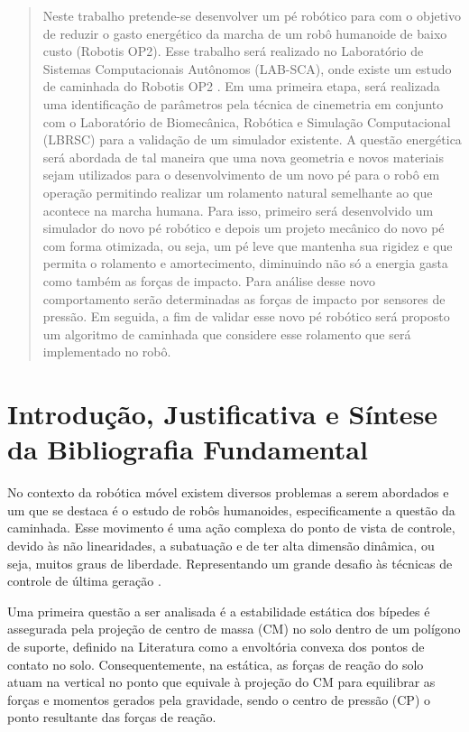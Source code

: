 \newpage
\doublespacing

\begin{abstract}
Neste trabalho pretende-se desenvolver um pé robótico para com o objetivo de reduzir o gasto energético da marcha de  um robô humanoide de baixo custo (Robotis OP2). Esse trabalho será realizado no  Laboratório de Sistemas Computacionais Autônomos (LAB-SCA), onde  existe um estudo de caminhada do Robotis OP2 . Em uma primeira etapa, será realizada uma identificação de parâmetros pela técnica de cinemetria em conjunto com o Laboratório de Biomecânica, Robótica e Simulação Computacional (LBRSC)  para a validação de um simulador existente.
A questão energética será abordada de tal maneira que uma nova geometria e novos materiais sejam utilizados para o desenvolvimento de um novo pé para o robô em operação permitindo realizar um rolamento natural semelhante ao que acontece na marcha humana. Para isso, primeiro será desenvolvido um simulador do novo pé robótico  e depois um projeto mecânico do novo pé com forma otimizada, ou seja, um pé leve que mantenha sua rigidez e que permita o rolamento e amortecimento, diminuindo não só a energia gasta como também as forças de impacto.
Para análise desse novo comportamento serão determinadas as forças de impacto por sensores de pressão. Em seguida, a fim de validar esse novo pé robótico será proposto um algoritmo de caminhada que considere esse rolamento que será implementado no robô.
\end{abstract}
\newpage
\section{Introdução, Justificativa e Síntese da Bibliografia Fundamental}



No contexto da robótica móvel existem diversos problemas a serem abordados e um que se destaca é o estudo de robôs humanoides, especificamente a questão da caminhada. Esse movimento é uma ação complexa do ponto de vista de controle, devido às não linearidades, a subatuação e  de ter alta dimensão dinâmica, ou seja, muitos graus de liberdade. Representando um grande desafio às técnicas de controle de última geração \cite{tedrake2005}.

Uma primeira questão a ser analisada é a estabilidade estática dos bípedes é assegurada pela projeção de centro de massa (CM) no solo dentro de um polígono de suporte, definido na Literatura como a envoltória convexa dos pontos de contato no solo. Consequentemente, na estática, as forças de reação do solo atuam na vertical no ponto que equivale à projeção do CM para equilibrar as forças e momentos gerados pela gravidade, sendo o centro de pressão (CP) o ponto resultante das forças de reação.

